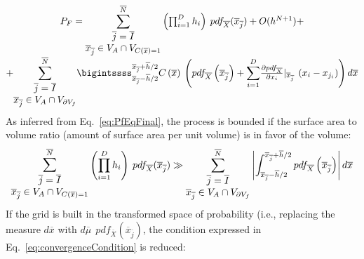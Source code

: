  \begin{equation}
 \label{eq:PfEqFinal}
 \begin{matrix}
P_{F} = \mathlarger{\sum}_{\begin{matrix}
\overline{j}=\overline{I} \\ \overline{x}_{\overline{j}} \in V_{A} \cap 
V_{C(\overline{x})=1} \end{matrix}}^{\overline{N}} 
\left ( \prod_{i=1}^{D} 
 h_{i} \right ) 
\: pdf_{\overline{X}} ( \overline{x}_{\overline{j}}) + O(h^{N+1}) +
 \\
 + \mathlarger{\sum}_{\begin{matrix}
\overline{j}=\overline{I} \\ \overline{x}_{\overline{j}} \in V_{A} \cap 
V_{\partial V_{f}} \end{matrix}}^{\overline{N}}
\bigintssss_{\overline{x}_{\overline{j}} - 
\overline{h}/2}^{\overline{x}_{\overline{j}} + \overline{h}/2} C\left ( 
\overline{x} \right )\: \left ( pdf_{\overline{X}}\left ( 
\overline{x}_{\overline{j}} \right ) +
\mathlarger{\sum}_{i=1}^{D} \frac{\partial pdf_{\overline{X}}}{\partial 
x_{i}}|_{\overline{x}_{\overline{j}}} \: \left ( x_{i} - x_{j_{i}} \right ) \right )   
d\overline{x}
\end{matrix} 
 \end{equation} 
As inferred from Eq.~\ref{eq:PfEqFinal}, the process is bounded if the 
surface area to volume ratio (amount of surface area per unit volume) is 
in favor of the volume:
\begin{equation}
\label{eq:convergenceCondition}
\mathlarger{\sum}_{\begin{matrix}
\overline{j}=\overline{I} \\ \overline{x}_{\overline{j}} \in V_{A} \cap 
V_{C(\overline{x})=1} \end{matrix}}^{\overline{N}} 
\left ( \prod_{i=1}^{D} 
 h_{i} \right ) 
\: pdf_{\overline{X}} ( \overline{x}_{\overline{j}})
\gg 
\sum_{\begin{matrix}
\overline{j}=\overline{I} \\ \overline{x}_{\overline{j}} \in V_{A} \cap 
V_{\partial V_{f}} \end{matrix}}^{\overline{N}}
\left | \int_{\overline{x}_{\overline{j}} - 
\overline{h}/2}^{\overline{x}_{\overline{j}} + \overline{h}/2}   pdf_{\overline{X}}\left ( 
\overline{x}_{\overline{j}} \right )  \right |
d\overline{x}
\end{equation}
If the grid is built in the transformed space of probability (i.e., replacing the measure $d\overline{x}$ with $d \overline{\mu }\: \: pdf_{\overline{X}}\left ( \overline{x}_{\overline{j}} \right )$, the condition expressed in Eq.~\ref{eq:convergenceCondition} is reduced:
